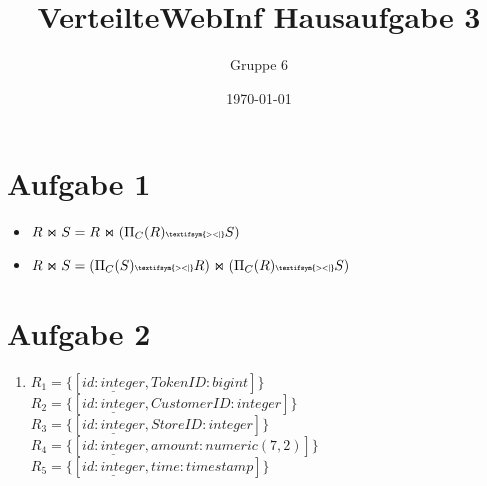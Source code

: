\documentclass[a4paper]{article}
\author{Gruppe 6}
\title{\textbf{VerteilteWebInf Hausaufgabe 3}}
\date{\today}
\newcommand{\RightSemiJoin}{\textbf{\tiny	 \textifsym{><|}}}
\begin{document}
\maketitle


\section*{Aufgabe 1}
\begin{itemize}
\item $R \Join S = R \Join  (\Pi_C(R) \RightSemiJoin S)$\\
\item $R \Join S =  (\Pi_C(S) \RightSemiJoin R) \Join  (\Pi_C(R) \RightSemiJoin S)$\\
\end{itemize}


\section*{Aufgabe 2}
\begin{enumerate}[label=\alph*)]

\item $R_1=\{[\underline{id:integer}, TokenID:bigint]\}$\\
			$R_2=\{[\underline{id:integer}, CustomerID:integer]\}$\\
			$R_3=\{[\underline{id:integer}, StoreID:integer]\}$\\
			$R_4=\{[\underline{id:integer}, amount:numeric(7,2)]\}$\\
			$R_5=\{[\underline{id:integer}, time:timestamp]\}$


\end{enumerate}
\end{document}
